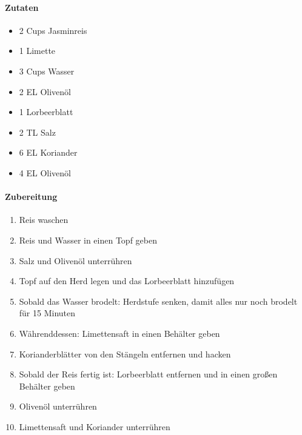 \newpage
{}

\paragraph{Zutaten}
\begin{itemize}[noitemsep]
	\item 2 Cups Jasminreis
	\item 1 Limette
	\item 3 Cups Wasser
	\item 2 EL Olivenöl
	\item 1 Lorbeerblatt
	\item 2 TL Salz
	\item 6 EL Koriander
	\item 4 EL Olivenöl
\end{itemize}

\paragraph{Zubereitung}
\begin{enumerate}[noitemsep]
	\item Reis waschen
	\item Reis und Wasser in einen Topf geben
	\item Salz und Olivenöl unterrühren
	\item Topf auf den Herd legen und das Lorbeerblatt hinzufügen
	\item Sobald das Wasser brodelt: Herdstufe senken, damit alles nur noch brodelt für 15 Minuten
	\item Währenddessen: Limettensaft in einen Behälter geben
	\item Korianderblätter von den Stängeln entfernen und hacken
	\item Sobald der Reis fertig ist: Lorbeerblatt entfernen und in einen großen Behälter geben
	\item Olivenöl unterrühren
	\item Limettensaft und Koriander unterrühren
\end{enumerate}
